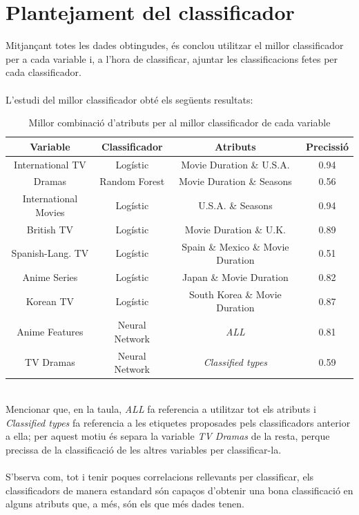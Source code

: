 \documentclass[a4paper, 11pt]{article}
\begin{document}
\section{Plantejament del classificador}
Mitjançant totes les dades obtingudes, és conclou utilitzar el millor classificador per a cada variable i, a l'hora de classificar, ajuntar les classificacions fetes per cada classificador.\\\\
L'estudi del millor classificador obté els següents resultats:
\begin{table}[h]
    \centering
    \begin{tabular}{c|c|c|c}
        \textbf{Variable} & \textbf{Classificador} & \textbf{Atributs} & \textbf{Precissió}\\ \hline \hline
         International TV & Logístic & Movie Duration \& U.S.A. & 0.94 \\ \hline
         Dramas & Random Forest & Movie Duration \& Seasons & 0.56 \\ \hline 
         International Movies & Logístic & U.S.A. \& Seasons & 0.94 \\ \hline 
         British TV & Logístic & Movie Duration \& U.K. & 0.89 \\ \hline 
         Spanish-Lang. TV & Logístic & Spain \& Mexico \& Movie Duration & 0.51 \\ \hline 
         Anime Series & Logístic & Japan \& Movie Duration & 0.82 \\ \hline 
         Korean TV & Logístic & South Korea \& Movie Duration & 0.87\\\hline 
         Anime Features & Neural Network & \textit{ALL} & 0.81 \\ \hline \hline 
         TV Dramas & Neural Network & \textit{Classified types} & 0.59
    \end{tabular}
    \caption{Millor combinació d'atributs per al millor classificador de cada variable}
    \label{tab:my_label}
\end{table}\\
Mencionar que, en la taula, \textit{ALL} fa referencia a utilitzar tot els atributs i \textit{Classified types} fa referencia a les etiquetes proposades pels classificadors anterior a ella; per aquest motiu és separa la variable \textit{TV Dramas} de la resta, perque precissa de la classificació de les altres variables per classificar-la.\\\\
S'bserva com, tot i tenir poques correlacions rellevants per classificar, els classificadors de manera estandard són capaços d'obtenir una bona classificació en alguns atributs que, a més, són els que més dades tenen.\\
\end{document}

